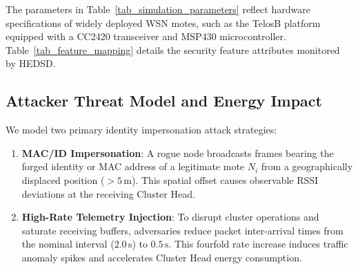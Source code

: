 \documentclass[conference]{IEEEtran}
\begin{document}
The parameters in Table~\ref{tab_simulation_parameters} reflect hardware specifications of widely deployed WSN motes, such as the TelosB platform equipped with a CC2420 transceiver and MSP430 microcontroller. Table~\ref{tab_feature_mapping} details the security feature attributes monitored by HEDSD.

\begin{table}[htbp]
\caption{Feature Mapping and Security Attributes}
\label{tab_feature_mapping}
\centering
\small
\renewcommand{\arraystretch}{1.15}
\end{table}

\subsection{Attacker Threat Model and Energy Impact}
\label{subsec_attack_model}
We model two primary identity impersonation attack strategies:
\begin{enumerate}
    \item \textbf{MAC/ID Impersonation}: A rogue node broadcasts frames bearing the forged identity or MAC address of a legitimate mote $N_i$ from a geographically displaced position ($>5\,\text{m}$). This spatial offset causes observable RSSI deviations at the receiving Cluster Head.
    \item \textbf{High-Rate Telemetry Injection}: To disrupt cluster operations and saturate receiving buffers, adversaries reduce packet inter-arrival times from the nominal interval ($2.0\,\text{s}$) to $0.5\,\text{s}$. This fourfold rate increase induces traffic anomaly spikes and accelerates Cluster Head energy consumption.
\end{enumerate}
\end{document}
